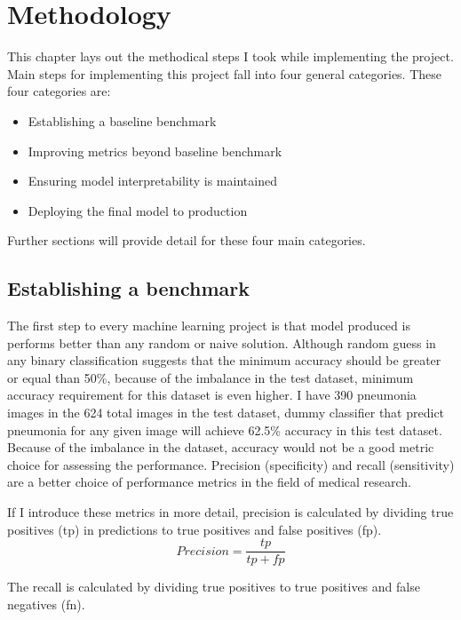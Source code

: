 \chapter{Methodology} \label{chap:methodology}
This chapter lays out the methodical steps I took while implementing the project.
Main steps for implementing this project fall into four general categories.
These four categories are:
\begin{itemize}
    \item Establishing a baseline benchmark
    \item Improving metrics beyond baseline benchmark
    \item Ensuring model interpretability is maintained
    \item Deploying the final model to production
\end{itemize}

Further sections will provide detail for these four main categories.

\section{Establishing a benchmark}
The first step to every machine learning project is that model produced is performs better than any random or naive solution.
Although random guess in any binary classification suggests that the minimum accuracy should be greater or equal than 50\%, because of the imbalance in the test dataset, minimum accuracy requirement for this dataset is even higher.
I have 390 pneumonia images in the 624 total images in the test dataset, dummy classifier that predict pneumonia for any given image will achieve 62.5\% accuracy in this test dataset.
Because of the imbalance in the dataset, accuracy would not be a good metric choice for assessing the performance.
Precision (specificity) and recall (sensitivity) are a better choice of performance metrics in the field of medical research.

If I introduce these metrics in more detail,
precision is calculated by dividing true positives (tp) in predictions to true positives and false positives (fp).
\begin{equation}
    Precision = \frac{tp}{tp + fp}
\end{equation}

The recall is calculated by dividing true positives to true positives and false negatives (fn).

